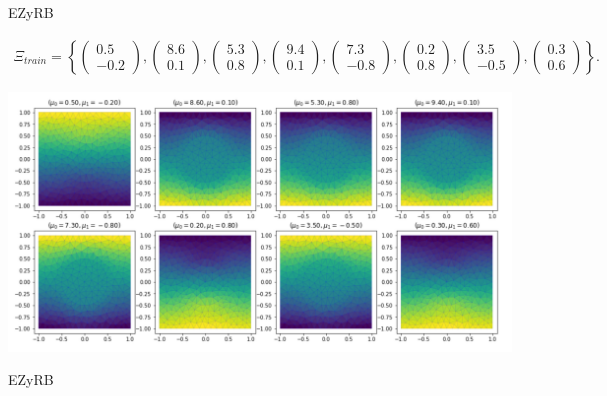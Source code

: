 \begin{frame}{EZyRB}
	\Large{}
	\normalsize
	
	\begin{align*}
	\Xi_{train}=
	\left\{
	\begin{pmatrix} 0.5 \\ -0.2 \end{pmatrix},
	\begin{pmatrix} 8.6 \\  0.1 \end{pmatrix},
	\begin{pmatrix} 5.3 \\  0.8 \end{pmatrix},
	\begin{pmatrix} 9.4 \\  0.1 \end{pmatrix},
	\begin{pmatrix} 7.3 \\ -0.8 \end{pmatrix},
	\begin{pmatrix} 0.2 \\  0.8 \end{pmatrix},
	\begin{pmatrix} 3.5 \\ -0.5 \end{pmatrix},
	\begin{pmatrix} 0.3 \\  0.6 \end{pmatrix}
	\right\}.
	\end{align*}
	
	\includegraphics[width=\textwidth]{../images/snapshots}
	
	
\end{frame}

\begin{frame}{EZyRB}
	\Large{}
	\normalsize
	
	\centering
	\scalebox{0.75}{
		
	}
	
\end{frame}


